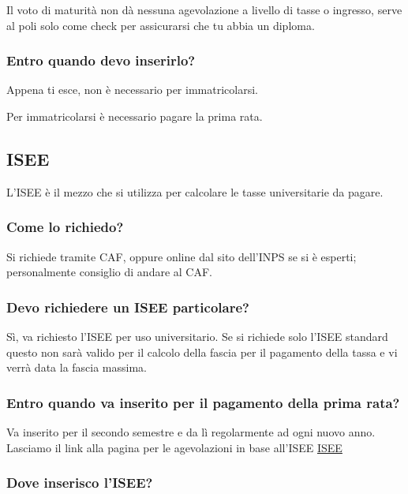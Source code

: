 \documentclass[legal]{polinetwork}
\begin{document}
Il voto di maturità non dà nessuna agevolazione a livello di tasse o ingresso, serve al poli solo come check per assicurarsi che tu abbia un diploma.

\subsubsection{Entro quando devo inserirlo?}


Appena ti esce, non è necessario per immatricolarsi.

Per immatricolarsi è necessario pagare la prima rata.

\subsection{ISEE}


L'ISEE è il mezzo che si utilizza per calcolare le tasse universitarie da pagare.

\subsubsection{Come lo richiedo?}


Si richiede tramite CAF, oppure online dal sito dell'INPS se si è esperti; personalmente consiglio di andare al CAF.

\subsubsection{Devo richiedere un ISEE particolare?}


Sì, va richiesto l'ISEE per uso universitario. Se si richiede solo l'ISEE standard questo non sarà valido per il calcolo della fascia per il pagamento della tassa e vi verrà data la fascia massima.

\subsubsection{Entro quando va inserito per il pagamento della prima rata?}


Va inserito per il secondo semestre e da lì regolarmente ad ogni nuovo anno. Lasciamo il link alla pagina per le agevolazioni in base all'ISEE \href{https://www.polimi.it/studenti/tasse-universitarie/graduazione-del-contributo-onnicomprensivo}{ISEE}

\subsubsection{Dove inserisco l'ISEE?}
\end{document}
